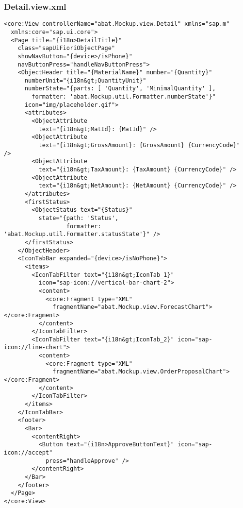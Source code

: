 \newpage
\subsubsection*{Detail.view.xml}
\begin{lstlisting}[frame=htrbl, label=lst:Detail.view.xml]
<core:View controllerName="abat.Mockup.view.Detail" xmlns="sap.m"
  xmlns:core="sap.ui.core">
  <Page title="{i18n>DetailTitle}"
    class="sapUiFioriObjectPage"
    showNavButton="{device>/isPhone}" 
    navButtonPress="handleNavButtonPress">
    <ObjectHeader title="{MaterialName}" number="{Quantity}"
      numberUnit="{i18n&gt;QuantityUnit}"
      numberState="{parts: [ 'Quantity', 'MinimalQuantity' ],
        formatter: 'abat.Mockup.util.Formatter.numberState'}"
      icon="img/placeholder.gif">
      <attributes>
        <ObjectAttribute 
          text="{i18n&gt;MatId}: {MatId}" />
        <ObjectAttribute
          text="{i18n&gt;GrossAmount}: {GrossAmount} {CurrencyCode}" />
        <ObjectAttribute
          text="{i18n&gt;TaxAmount}: {TaxAmount} {CurrencyCode}" />
        <ObjectAttribute
          text="{i18n&gt;NetAmount}: {NetAmount} {CurrencyCode}" />
      </attributes>
      <firstStatus>
        <ObjectStatus text="{Status}"
          state="{path: 'Status',
                  formatter: 'abat.Mockup.util.Formatter.statusState'}" />
      </firstStatus>
    </ObjectHeader>
    <IconTabBar expanded="{device>/isNoPhone}">
      <items>
        <IconTabFilter text="{i18n&gt;IconTab_1}"
          icon="sap-icon://vertical-bar-chart-2">
          <content>
            <core:Fragment type="XML"
              fragmentName="abat.Mockup.view.ForecastChart"></core:Fragment>
          </content>
        </IconTabFilter>
        <IconTabFilter text="{i18n&gt;IconTab_2}" icon="sap-icon://line-chart">
          <content>
            <core:Fragment type="XML"
              fragmentName="abat.Mockup.view.OrderProposalChart"></core:Fragment>
          </content>
        </IconTabFilter>
      </items>
    </IconTabBar>
    <footer>
      <Bar>
        <contentRight>
          <Button text="{i18n>ApproveButtonText}" icon="sap-icon://accept"
            press="handleApprove" />
        </contentRight>
      </Bar>
    </footer>
  </Page>
</core:View>
\end{lstlisting}

\newpage
